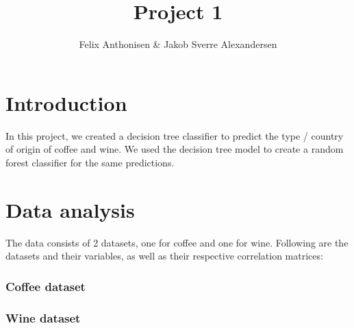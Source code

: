 \documentclass[11pt]{article}
\title{Project 1 }
\author{Felix Anthonisen & Jakob Sverre Alexandersen}
\begin{document}
    
    \maketitle
    
    

    \section{Introduction}\label{introduction}

In this project, we created a decision tree classifier to predict the
type / country of origin of coffee and wine. We used the decision tree
model to create a random forest classifier for the same predictions.

    \section{Data analysis}\label{data-analysis}

The data consists of 2 datasets, one for coffee and one for wine. 
Following are the datasets and their variables, as well as their respective
correlation matrices:

\subsubsection{Coffee dataset}\label{coffee-dataset}



    \begin{center}
    \end{center}
    
    


    \begin{center}
    \end{center}
    
    
    \subsubsection{Wine dataset}\label{wine-dataset}



    \begin{center}
    \end{center}
    
\end{document}
